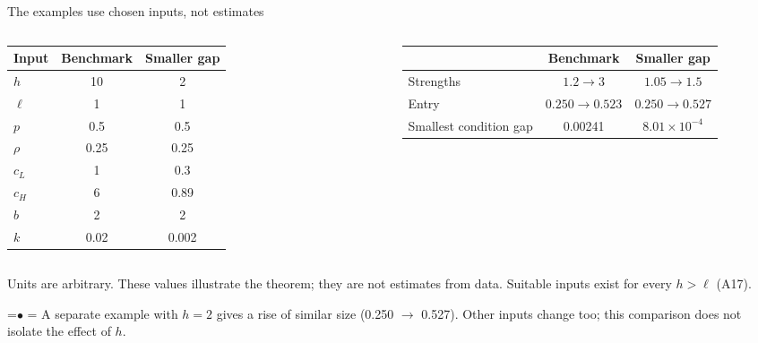 \documentclass[10pt,aspectratio=169]{beamer}
\newcommand{\GrayLine}[1]{\par{\color{cGrayText}\footnotesize #1\par}}
\newcommand{\TakeawayBody}[1]{\begin{minipage}{\textwidth}\raggedright\normalsize
    \setbox0=\hbox{{\usebeamercolor[fg]{structure}\raise0.7pt\hbox{\scriptsize$\bullet$}}\hspace{0.55em}}%
    \hangindent=\wd0 \hangafter=1 \noindent\box0 #1\par
  \end{minipage}}
\renewcommand{\Takeaway}[2][\ExhibitReadingGap]{\par\vspace{#1}\noindent\TakeawayBody{#2}\par}
\newcommand{\NavGap}{\par\vspace{0.45cm}}%
\let\AdapterBackButton\BackButton
\renewcommand{\BackButton}[1]{\NavGap\AdapterBackButton{#1}}%
\begin{document}
\begin{frame}[label=A19]{The examples use chosen inputs, not estimates}
\hypertarget{app:scale}{}
\vspace{4pt}
{\small
\begin{columns}[c]
\centering
\begin{tabular}{@{}lcc@{}}
\toprule
Input & Benchmark & Smaller gap\\
\midrule
$h$ & 10 & 2\\ %
$\ell$ & 1 & 1\\ %
$p$ & 0.5 & 0.5\\ %
$\rho$ & 0.25 & 0.25\\ %
$c_L$ & 1 & 0.3\\ %
$c_H$ & 6 & 0.89\\ %
$b$ & 2 & 2\\ %
$k$ & 0.02 & 0.002\\ %
\bottomrule
\end{tabular}
\centering
\begin{tabular}{@{}lcc@{}}
\toprule
 & Benchmark & Smaller gap\\
\midrule
Strengths & $1.2\to3$ & $1.05\to1.5$\\ %
Entry & $0.250\to0.523$ & $0.250\to0.527$\\ %
Smallest condition gap & 0.00241 & $8.01\times10^{-4}$\\ %
\bottomrule
\end{tabular}
\end{columns}}
\medskip
\GrayLine{Units are arbitrary. These values illustrate the theorem; they are not estimates from data. Suitable inputs exist for every $h>\ell$ (A17).}
\Takeaway{A separate example with $h=2$ %
gives a rise of similar size (0.250 %
$\to$ 0.527). %
Other inputs change too; this comparison does not isolate the effect of $h$.}
\end{frame}
\end{document}
